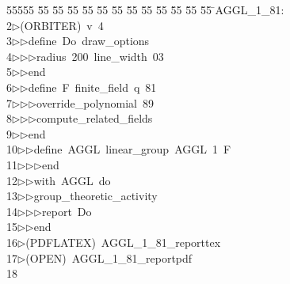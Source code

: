 %
%
\begin{tabbing}
55555 \= 55 \= 55 \= 55 \= 55 \= 55 \= 55 \= 55 \= 55 \= 55 \= 55 \= 55 \= 55 \= \>AGGL\_1\_81:\\[0pt]
2\>$\triangleright$\>(ORBITER)\ v\ 4\ \\[0pt]
3\>$\triangleright$\>$\triangleright$\>define\ Do\ draw\_options\ \\[0pt]
4\>$\triangleright$\>$\triangleright$\>$\triangleright$\>radius\ 200\ line\_width\ 03\ \\[0pt]
5\>$\triangleright$\>$\triangleright$\>end\ \\[0pt]
6\>$\triangleright$\>$\triangleright$\>define\ F\ finite\_field\ q\ 81\ \\[0pt]
7\>$\triangleright$\>$\triangleright$\>$\triangleright$\>override\_polynomial\ 89\ \\[0pt]
8\>$\triangleright$\>$\triangleright$\>$\triangleright$\>compute\_related\_fields\ \\[0pt]
9\>$\triangleright$\>$\triangleright$\>end\ \\[0pt]
10\>$\triangleright$\>$\triangleright$\>define\ AGGL\ linear\_group\ AGGL\ 1\ F\ \\[0pt]
11\>$\triangleright$\>$\triangleright$\>$\triangleright$\>end\ \\[0pt]
12\>$\triangleright$\>$\triangleright$\>with\ AGGL\ do\ \\[0pt]
13\>$\triangleright$\>$\triangleright$\>group\_theoretic\_activity\ \\[0pt]
14\>$\triangleright$\>$\triangleright$\>$\triangleright$\>report\ Do\ \\[0pt]
15\>$\triangleright$\>$\triangleright$\>end\\[0pt]
16\>$\triangleright$\>(PDFLATEX)\ AGGL\_1\_81\_reporttex\\[0pt]
17\>$\triangleright$\>(OPEN)\ AGGL\_1\_81\_reportpdf\\[0pt]
18\>\end{tabbing}
